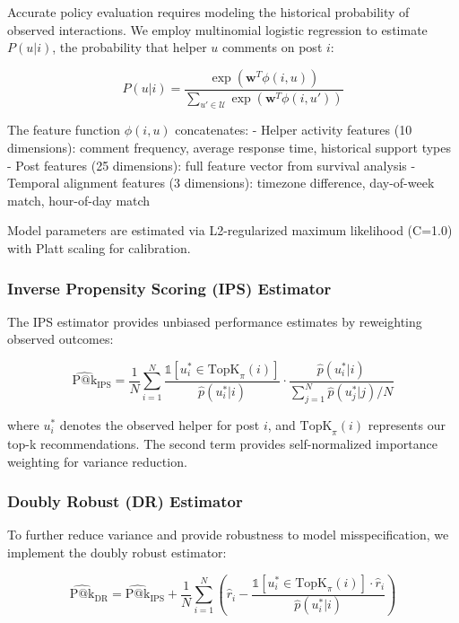 \documentclass[letterpaper]{article} %
\begin{document}
Accurate policy evaluation requires modeling the historical probability of observed interactions. We employ multinomial logistic regression to estimate $P(u|i)$, the probability that helper $u$ comments on post $i$:

\begin{equation}
P(u|i) = \frac{\exp(\mathbf{w}^T \phi(i,u))}{\sum_{u' \in \mathcal{U}} \exp(\mathbf{w}^T \phi(i,u'))}
\end{equation}

The feature function $\phi(i,u)$ concatenates:
- Helper activity features (10 dimensions): comment frequency, average response time, historical support types
- Post features (25 dimensions): full feature vector from survival analysis
- Temporal alignment features (3 dimensions): timezone difference, day-of-week match, hour-of-day match

Model parameters are estimated via L2-regularized maximum likelihood (C=1.0) with Platt scaling for calibration.

\subsubsection{Inverse Propensity Scoring (IPS) Estimator}

The IPS estimator provides unbiased performance estimates by reweighting observed outcomes:

\begin{equation}
\widehat{\text{P@k}}_\text{IPS} = \frac{1}{N} \sum_{i=1}^N \frac{\mathbb{1}[u_i^* \in \text{TopK}_\pi(i)]}{\hat{p}(u_i^*|i)} \cdot \frac{\hat{p}(u_i^*|i)}{\sum_{j=1}^N \hat{p}(u_j^*|j)/N}
\end{equation}

where $u_i^*$ denotes the observed helper for post $i$, and $\text{TopK}_\pi(i)$ represents our top-k recommendations. The second term provides self-normalized importance weighting for variance reduction.

\subsubsection{Doubly Robust (DR) Estimator}

To further reduce variance and provide robustness to model misspecification, we implement the doubly robust estimator:

\begin{equation}
\widehat{\text{P@k}}_\text{DR} = \widehat{\text{P@k}}_\text{IPS} + \frac{1}{N}\sum_{i=1}^N \left(\hat{r}_i - \frac{\mathbb{1}[u_i^* \in \text{TopK}_\pi(i)] \cdot \hat{r}_i}{\hat{p}(u_i^*|i)}\right)
\end{equation}
\end{document}
